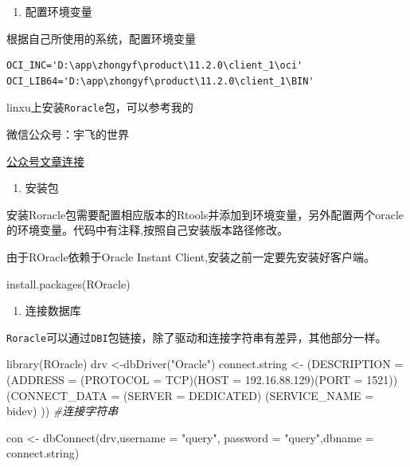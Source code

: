 \documentclass[
]{book}
\newenvironment{Shaded}{\begin{snugshade}}{\end{snugshade}}
\newcommand{\AttributeTok}[1]{\textcolor[rgb]{0.77,0.63,0.00}{#1}}
\newcommand{\CommentTok}[1]{\textcolor[rgb]{0.56,0.35,0.01}{\textit{#1}}}
\newcommand{\FunctionTok}[1]{\textcolor[rgb]{0.00,0.00,0.00}{#1}}
\newcommand{\NormalTok}[1]{#1}
\newcommand{\OtherTok}[1]{\textcolor[rgb]{0.56,0.35,0.01}{#1}}
\newcommand{\StringTok}[1]{\textcolor[rgb]{0.31,0.60,0.02}{#1}}
\providecommand{\tightlist}{%
  \setlength{\itemsep}{0pt}\setlength{\parskip}{0pt}}
\begin{document}
\begin{enumerate}
\def\labelenumi{\arabic{enumi}.}
\setcounter{enumi}{1}
\tightlist
\item
  配置环境变量
\end{enumerate}

根据自己所使用的系统，配置环境变量

\begin{verbatim}
OCI_INC='D:\app\zhongyf\product\11.2.0\client_1\oci'
OCI_LIB64='D:\app\zhongyf\product\11.2.0\client_1\BIN'
\end{verbatim}

linxu上安装\texttt{Roracle}包，可以参考我的

微信公众号：宇飞的世界

\href{https://mp.weixin.qq.com/s/QLwedZ5mTybqSXdHMTGRIw}{公众号文章连接}

\begin{enumerate}
\def\labelenumi{\arabic{enumi}.}
\setcounter{enumi}{2}
\tightlist
\item
  安装包
\end{enumerate}

安装Roracle包需要配置相应版本的Rtools并添加到环境变量，另外配置两个oracle的环境变量。代码中有注释,按照自己安装版本路径修改。

由于ROracle依赖于Oracle Instant Client,安装之前一定要先安装好客户端。

\begin{Shaded}
\begin{Highlighting}[]
\FunctionTok{install.packages}\NormalTok{(}\StringTok{\textquotesingle{}ROracle\textquotesingle{}}\NormalTok{)}
\end{Highlighting}
\end{Shaded}

\begin{enumerate}
\def\labelenumi{\arabic{enumi}.}
\setcounter{enumi}{3}
\tightlist
\item
  连接数据库
\end{enumerate}

\texttt{Roracle}可以通过\texttt{DBI}包链接，除了驱动和连接字符串有差异，其他部分一样。

\begin{Shaded}
\begin{Highlighting}[]
\FunctionTok{library}\NormalTok{(ROracle)}
\NormalTok{drv }\OtherTok{\textless{}{-}}\FunctionTok{dbDriver}\NormalTok{(}\StringTok{"Oracle"}\NormalTok{)}
\NormalTok{connect.string }\OtherTok{\textless{}{-}} \StringTok{\textquotesingle{}(DESCRIPTION =}
\StringTok{                    (ADDRESS = (PROTOCOL = TCP)(HOST = 192.16.88.129)(PORT = 1521))}
\StringTok{                  (CONNECT\_DATA =}
\StringTok{                      (SERVER = DEDICATED)}
\StringTok{                    (SERVICE\_NAME = bidev)}
\StringTok{                  ))\textquotesingle{}} \CommentTok{\#连接字符串}

\NormalTok{con }\OtherTok{\textless{}{-}} \FunctionTok{dbConnect}\NormalTok{(drv,}\AttributeTok{username =} \StringTok{"query"}\NormalTok{, }\AttributeTok{password =} \StringTok{"query"}\NormalTok{,}\AttributeTok{dbname =}\NormalTok{ connect.string)}
\end{Highlighting}
\end{Shaded}
\end{document}
